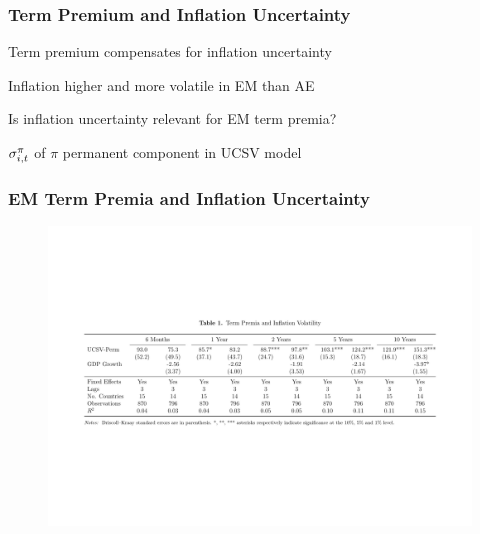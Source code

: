 \documentclass[12pt, aspectratio=169, xcolor=dvipsnames]{beamer}
\begin{document}
\begin{frame}[label=tpUCSV]
\frametitle{Term Premium and Inflation Uncertainty}

Term premium compensates for \alert{inflation uncertainty} \citep{Wright:2011}

Inflation higher and \alert{more volatile} in EM than AE \citep{HaKoseOhnsorge:2019}
\newline

Is inflation uncertainty relevant for EM term premia?


\(\sigma^{\pi}_{i,t}\) of \(\pi\) permanent component in UCSV model \citep{StockWatson:2007}

\end{frame}


\begin{frame}
\frametitle{EM Term Premia and Inflation Uncertainty}
%	
\vspace{-0.8cm}
\begin{figure}[!htbp]
\begin{center} %
\includegraphics[trim={2.5cm 6cm 2.5cm 7cm},clip, width=1\textwidth,height=0.95\textheight]{../Tables/tpucsv.pdf}
\par\end{center}
\end{figure}
\end{frame}
\end{document}
